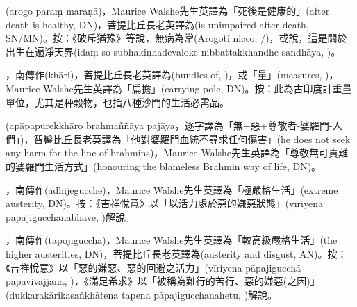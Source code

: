 \startitemgroup[noteitems]
\item{}(arogo paraṃ maraṇā)，Maurice Walshe先生英譯為「死後是健康的」(after death is healthy, DN)，菩提比丘長老英譯為(is unimpaired after death, SN/MN)。按：《破斥猶豫》等說，無病為常(Arogoti nicco, /)，或說，這是關於出生在遍淨天界(idaṃ so subhakiṇhadevaloke nibbattakkhandhe sandhāya, )。
\stopitemgroup

\startitemgroup[noteitems]
\item{}，南傳作(khāri)，菩提比丘長老英譯為(bundles of, )，或「量」(measures, )，Maurice Walshe先生英譯為「扁擔」(carrying-pole, DN)。按：此為古印度計重量單位，尤其是秤穀物，也指八種沙門的生活必需品。
\stopitemgroup

\startitemgroup[noteitems]
\item{}(apāpapurekkhāro brahmaññāya pajāya，逐字譯為「無+惡+尊敬者-婆羅門-人們」)，智髻比丘長老英譯為「他對婆羅門血統不尋求任何傷害」(he does not seek any harm for the line of brahmins)，Maurice Walshe先生英譯為「尊敬無可責難的婆羅門生活方式」(honouring the blameless Brahmin way of life, DN)。
\stopitemgroup

\startitemgroup[noteitems]
\item{}，南傳作(adhijegucche)，Maurice Walshe先生英譯為「極嚴格生活」(extreme austerity, DN)。按：《吉祥悅意》以「以活力處於惡的嫌惡狀態」(vīriyena pāpajigucchanabhāve, )解說。
\stopitemgroup

\startitemgroup[noteitems]
\item{}，南傳作(tapojigucchā)，Maurice Walshe先生英譯為「較高級嚴格生活」(the higher austerities, DN)，菩提比丘長老英譯為(austerity and disgust, AN)。按：《吉祥悅意》以「惡的嫌惡、惡的回避之活力」(vīriyena pāpajigucchā pāpavivajjanā, )，《滿足希求》以「被稱為難行的苦行、惡的嫌惡(之因)」(dukkarakārikasaṅkhātena tapena pāpajigucchanahetu, )解說。
\stopitemgroup

